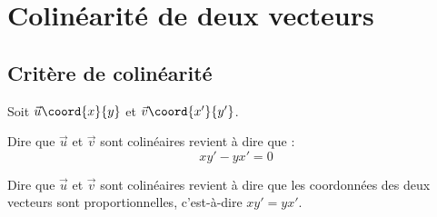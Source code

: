 \section{Colinéarité de deux vecteurs}

\subsection{Critère de colinéarité}

\begin{prop}
	Soit $\vec{u}\coord{x}{y}$ et $\vec{v}\coord{x'}{y'}$.

	Dire que $\vec{u}$ et $\vec{v}$ sont colinéaires revient à dire que :
	\[
		xy' - yx' = 0
	\]
\end{prop}

\begin{remarque}
	Dire que $\vec{u}$ et $\vec{v}$ sont colinéaires revient à dire que les coordonnées des deux vecteurs sont proportionnelles, c'est-à-dire $xy' = yx'$.
\end{remarque}

